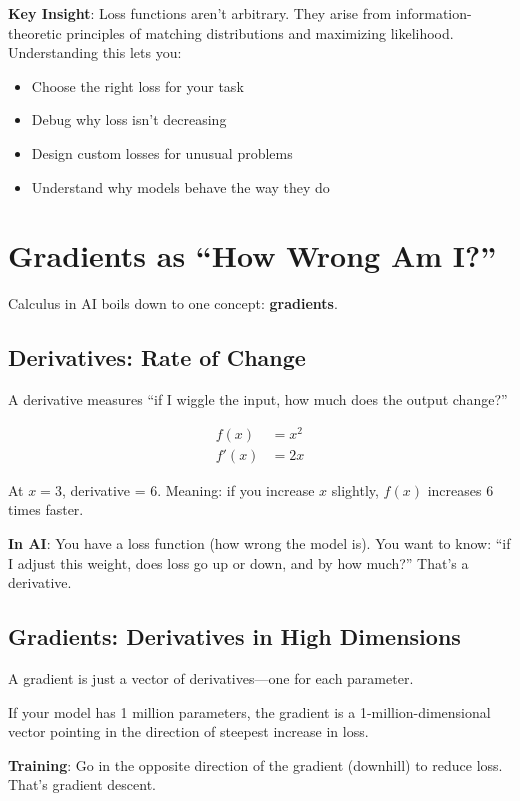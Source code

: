 \documentclass[11pt,oneside]{book}
\begin{document}
\textbf{Key Insight}: Loss functions aren't arbitrary. They arise from information-theoretic principles of matching distributions and maximizing likelihood. Understanding this lets you:
\begin{itemize}
\item Choose the right loss for your task
\item Debug why loss isn't decreasing
\item Design custom losses for unusual problems
\item Understand why models behave the way they do
\end{itemize}

\section{Gradients as ``How Wrong Am I?''}

Calculus in AI boils down to one concept: \textbf{gradients}.

\subsection{Derivatives: Rate of Change}

A derivative measures ``if I wiggle the input, how much does the output change?''

\begin{align*}
f(x) &= x^2 \\
f'(x) &= 2x
\end{align*}

At $x=3$, derivative = 6. Meaning: if you increase $x$ slightly, $f(x)$ increases 6 times faster.

\textbf{In AI}: You have a loss function (how wrong the model is). You want to know: ``if I adjust this weight, does loss go up or down, and by how much?'' That's a derivative.

\subsection{Gradients: Derivatives in High Dimensions}

A gradient is just a vector of derivatives---one for each parameter.

If your model has 1 million parameters, the gradient is a 1-million-dimensional vector pointing in the direction of steepest increase in loss.

\textbf{Training}: Go in the opposite direction of the gradient (downhill) to reduce loss. That's gradient descent.
\end{document}
